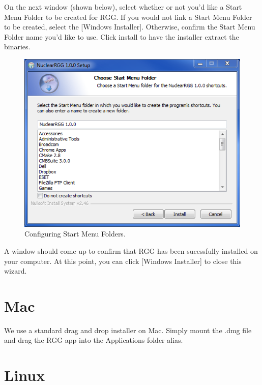 On the next window (shown below), select whether or not you'd like a Start Menu Folder to be created for RGG.  If you would not link a Start Menu Folder to be created, select the [Windows Installer].  Otherwise, confirm the Start Menu Folder name you'd like to use.  Click install to have the installer extract the binaries.

\begin{figure}[H]
	\begin{center}
		\includegraphics[width=0.5\linewidth]{Images/windows-install-3.png}
		\caption{Configuring Start Menu Folders.}
		\label{fig:WindowsInstall3}
	\end{center}
\end{figure}

A window should come up to confirm that RGG has been sucessfully installed on your computer.  At this point, you can click [Windows Installer] to close this wizard.

\section{Mac}
We use a standard drag and drop installer on Mac.  Simply mount the .dmg file and drag the RGG app into the Applications folder alias.

\section{Linux}
